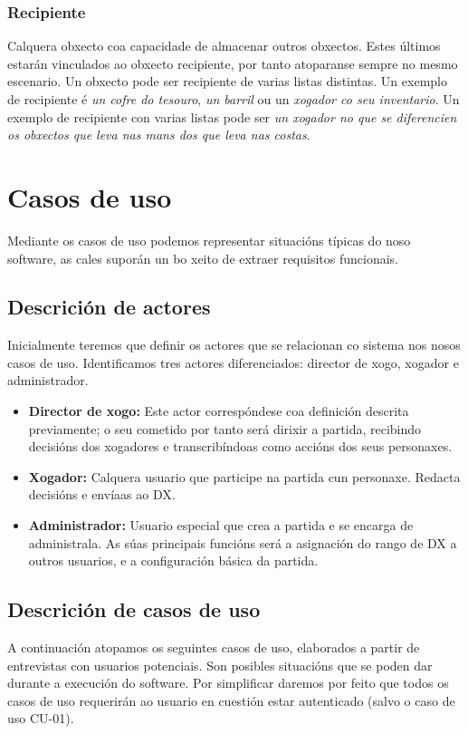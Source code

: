 \subsubsection{Recipiente}
Calquera obxecto coa capacidade de almacenar outros obxectos. Estes últimos
estarán vinculados ao obxecto recipiente, por tanto atoparanse sempre no mesmo
escenario. Un obxecto pode ser recipiente de varias listas distintas.
Un exemplo de recipiente é {\it un cofre do tesouro}, {\it un barril} ou un {\it
xogador co seu inventario}. Un exemplo de recipiente con varias listas pode ser
{\it un xogador no que se diferencien os obxectos que leva nas mans dos que leva
nas costas}.


\section{Casos de uso}
Mediante os casos de uso podemos representar situacións típicas do noso
software, as cales suporán un bo xeito de extraer requisitos funcionais.

\subsection{Descrición de actores}
Inicialmente teremos que definir os actores que se relacionan co sistema nos
nosos casos de uso. Identificamos tres actores diferenciados: director de xogo,
xogador e administrador.
\begin{itemize}
\item {\bf Director de xogo:} Este actor correspóndese coa definición descrita previamente; o seu cometido por tanto será dirixir a partida, recibindo decisións dos xogadores e transcribíndoas como accións dos seus personaxes.
\item {\bf Xogador:} Calquera usuario que participe na partida cun personaxe. Redacta decisións e envíaas ao DX.
\item {\bf Administrador:} Usuario especial que crea a partida e se encarga de administrala. As súas principais funcións será a asignación do rango de DX a outros usuarios, e a configuración básica da partida.
\end{itemize}

\subsection{Descrición de casos de uso}
A continuación atopamos os seguintes casos de uso, elaborados a partir de
entrevistas con usuarios potenciais. Son posibles situacións que se poden dar
durante a execución do software.
Por simplificar daremos por feito que todos os casos de uso requerirán ao
usuario en cuestión estar autenticado (salvo o caso de uso CU-01).

